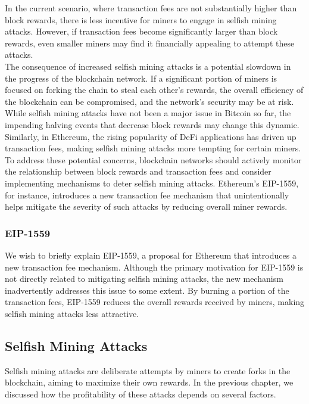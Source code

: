 In the current scenario, where transaction fees are not substantially higher than block rewards, there is less incentive for miners to engage in selfish mining attacks. However, if transaction fees become significantly larger than block rewards, even smaller miners may find it financially appealing to attempt these attacks.\\
The consequence of increased selfish mining attacks is a potential slowdown in the progress of the blockchain network. If a significant portion of miners is focused on forking the chain to steal each other's rewards, the overall efficiency of the blockchain can be compromised, and the network's security may be at risk.\\
While selfish mining attacks have not been a major issue in Bitcoin so far, the impending halving events that decrease block rewards may change this dynamic. Similarly, in Ethereum, the rising popularity of DeFi applications has driven up transaction fees, making selfish mining attacks more tempting for certain miners.\\
To address these potential concerns, blockchain networks should actively monitor the relationship between block rewards and transaction fees and consider implementing mechanisms to deter selfish mining attacks. Ethereum's EIP-1559, for instance, introduces a new transaction fee mechanism that unintentionally helps mitigate the severity of such attacks by reducing overall miner rewards.

\subsubsection{EIP-1559}
We wish to briefly explain EIP-1559, a proposal for Ethereum that introduces a new transaction fee mechanism. Although the primary motivation for EIP-1559 is not directly related to mitigating selfish mining attacks, the new mechanism inadvertently addresses this issue to some extent. By burning a portion of the transaction fees, EIP-1559 reduces the overall rewards received by miners, making selfish mining attacks less attractive.

\subsection{Selfish Mining Attacks}
Selfish mining attacks are deliberate attempts by miners to create forks in the blockchain, aiming to maximize their own rewards. In the previous chapter, we discussed how the profitability of these attacks depends on several factors.

